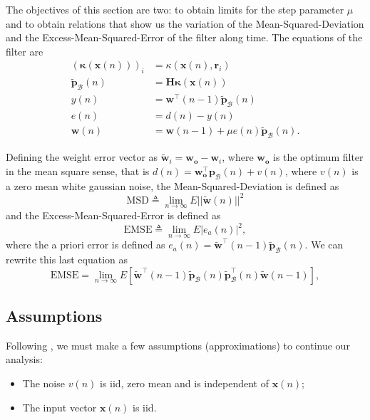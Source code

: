 The objectives of this section are two: to obtain limits for the step parameter $\mu$ and to obtain relations that show us the variation of the Mean-Squared-Deviation 
and the Excess-Mean-Squared-Error of the filter along time. The equations of the filter are
\begin{align}
    (\boldsymbol{\kappa}(\mathbf{x}(n)))_i &= \kappa(\mathbf{x}(n),\mathbf{r}_i)\\
    \tilde{\mathbf{p}}_{\mathcal{B}}(n) &= \mathbf{H}\boldsymbol{\kappa}(\mathbf{x}(n))\\
    y(n) &= \mathbf{w}^\top(n-1) \tilde{\mathbf{p}}_{\mathcal{B}}(n)\\
    e(n) &= d(n) - y(n)\\
    \mathbf{w}(n) &= \mathbf{w}(n-1) + \mu e(n) \tilde{\mathbf{p}}_{\mathcal{B}}(n).\label{eq:w_adapt}
\end{align}

Defining  the weight error vector as $\tilde{\mathbf{w}}_i = \mathbf{w}_{\mathbf{o}}-\mathbf{w}_i$, where $\mathbf{w}_{\mathbf{o}}$ is the optimum filter in the mean square sense, 
that is $d(n) = \mathbf{w}_{\mathbf{o}}^\top\mathbf{p}_{\mathcal{B}}(n) + v(n) $, where $v(n)$ is a zero mean white gaussian noise, the Mean-Squared-Deviation is defined as
\begin{equation}
    \text{MSD} \triangleq \lim_{n\rightarrow \infty} E || \tilde{\mathbf{w}}(n) ||^2
\end{equation}
and the Excess-Mean-Squared-Error is defined as 
\begin{equation}
    \text{EMSE} \triangleq \lim_{n\rightarrow \infty} E | e_a(n) |^2, 
\end{equation}
where the a priori error is defined as $e_a(n) = \tilde{\mathbf{w}}^\top(n-1)\tilde{\mathbf{p}}_{\mathcal{B}}(n)$. We can rewrite this last equation as 
\begin{equation}
    \text{EMSE} = \lim_{n\rightarrow \infty} E \left[\tilde{\mathbf{w}}^\top(n-1)\tilde{\mathbf{p}}_{\mathcal{B}}(n)\tilde{\mathbf{p}}^\top_{\mathcal{B}}(n)\tilde{\mathbf{w}}(n-1)\right],\label{eq:emse_wppw} 
\end{equation}

\subsection{Assumptions}

Following \cite{al-naffouri_transient_2003}, we must make a few assumptions (approximations) to continue our analysis:
\begin{itemize}
    \item The noise $v(n)$ is iid, zero mean and is independent of $\mathbf{x}(n)$;
    \item The input vector $\mathbf{x}(n)$ is iid.
\end{itemize}

